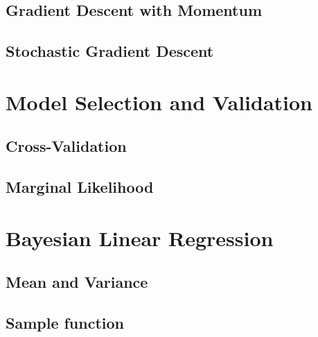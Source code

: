 	\subsection{Gradient Descent with Momentum}

	\subsection{Stochastic Gradient Descent}


\section{Model Selection and Validation}

	\subsection{Cross-Validation}

	\subsection{Marginal Likelihood}

\section{Bayesian Linear Regression}

	\subsection{Mean and Variance}

	\subsection{Sample function}


